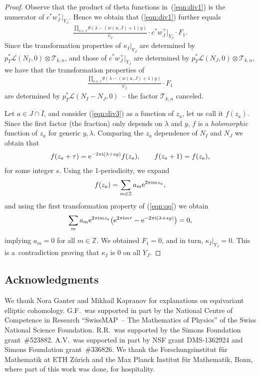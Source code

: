 \documentclass[pdftex]{sigma}
\numberwithin{equation}{section}
\begin{document}
\begin{proof}
Observe that the product of theta functions in~(\ref{eqn:div1}) is the numerator of $c ^*w_J^+|_{Y_J}$. Hence we obtain that (\ref{eqn:div1}) further equals
\begin{gather*}
\frac{\prod\limits_{a\in J} \theta(\lambda-(w(a,J)+1)y)}{\psi_I} \cdot c ^*w_J^+|_{Y_J} \cdot F_1.
\end{gather*}
Since the transformation properties of $\kappa_I|_{Y_J}$ are determined by $p_T^*\mathcal L(N_I,0)\otimes \mathcal T_{k,n}$, and those of $c ^* w_J^+|_{Y_J}$ are determined by $p_T^*\mathcal L(N_J,0)\otimes \mathcal T_{k,n}$, we have that the transformation properties of
\begin{gather}\label{eqn:div3}
\frac{\prod\limits_{a\in J} \theta(\lambda-(w(a,J)+1)y)}{\psi_I} \cdot F_1
\end{gather}
are determined by $p_T^*\mathcal L(N_I-N_J,0)$~-- the factor $\mathcal T_{k,n}$ canceled.

Let $a\in J \cap \bar{I}$, and consider (\ref{eqn:div3}) as a function of $z_a$, let us call it $f(z_a)$. Since the first factor (the fraction) only depends on $\lambda$ and $y$, $f$ is a {\em holomorphic} function of $z_a$ for generic $y,\lambda$. Comparing the $z_a$ dependence of $N_I$ and $N_J$ we obtain that
\begin{gather}\label{eqn:qq}
f(z_a+\tau)={\rm e}^{-2\pi{\rm i} (\lambda+sy)} f(z_a), \qquad f(z_a+1)=f(z_a),
\end{gather}
for some integer $s$. Using the 1-periodicity, we expand
\begin{gather*}
f(z_a)=\sum_{m\in \mathbb Z} a_m {\rm e}^{2\pi{\rm i} m z_a},
\end{gather*}
and using the first transformation property of (\ref{eqn:qq}) we obtain
\begin{gather*}
\sum_m a_m {\rm e}^{2\pi{\rm i} m z_a} \big( {\rm e}^{2\pi{\rm i} m \tau} - {\rm e}^{-2\pi{\rm i} (\lambda+sy)} \big)=0,
\end{gather*}
implying $a_m=0$ for all $m\in \mathbb Z$. We obtained $F_1=0$, and in turn, $\kappa_I|_{Y_J}=0$. This is a~contradiction proving that $\kappa_I$ is 0 on all $Y_J$.
\end{proof}

\subsection*{Acknowledgments} We thank Nora Ganter and Mikhail Kapranov for explanations on equivariant elliptic co\-ho\-mo\-logy. G.F.\ was supported in part by the National Centre of Competence in Research ``SwissMAP~-- The Mathematics of Physics'' of the Swiss National Science Foundation. R.R.\ was supported by the Simons Foundation grant~\#523882. A.V.\ was supported in part by NSF grant DMS-1362924 and Simons Foundation grant~\#336826. We thank the Forschungsinstitut f\"ur Mathematik at ETH Z\"urich and the Max Planck Institut f\"ur Mathematik, Bonn, where part of this work was done, for hospitality.
\end{document}
